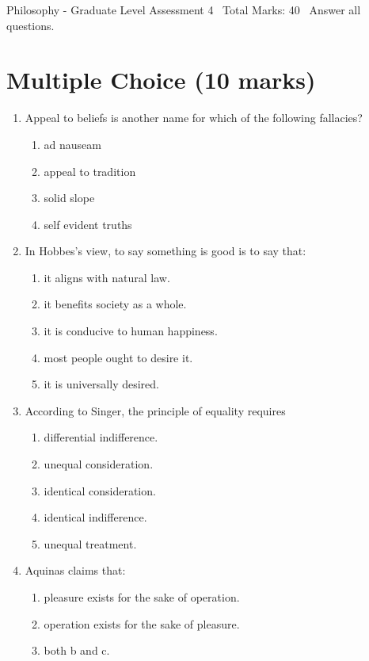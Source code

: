 \documentclass[12pt]{article}
\begin{document}
\begin{center}
Philosophy - Graduate Level Assessment 4 \
Total Marks: 40 \
Answer all questions.
\end{center}

\section*{Multiple Choice (10 marks)}
\begin{enumerate}[label=\arabic*.]
\item Appeal to beliefs is another name for which of the following fallacies?
\begin{enumerate}[label=(\alph*)]
    \item ad nauseam
    \item appeal to tradition
    \item solid slope
    \item self evident truths
\end{enumerate}
\item In Hobbes's view, to say something is good is to say that:
\begin{enumerate}[label=(\alph*)]
    \item it aligns with natural law.
    \item it benefits society as a whole.
    \item it is conducive to human happiness.
    \item most people ought to desire it.
    \item it is universally desired.
\end{enumerate}
\item According to Singer, the principle of equality requires
\begin{enumerate}[label=(\alph*)]
    \item differential indifference.
    \item unequal consideration.
    \item identical consideration.
    \item identical indifference.
    \item unequal treatment.
\end{enumerate}
\item Aquinas claims that:
\begin{enumerate}[label=(\alph*)]
    \item pleasure exists for the sake of operation.
    \item operation exists for the sake of pleasure.
    \item both b and c.

\end{enumerate}
\end{enumerate}
\end{document}
